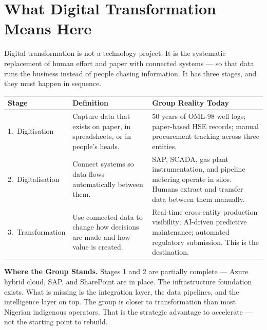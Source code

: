 \documentclass[10pt]{article}
\begin{document}
\vspace{10pt}

\section{What Digital Transformation Means Here}

Digital transformation is not a technology project. It is the systematic replacement
of human effort and paper with connected systems --- so that data runs the business
instead of people chasing information. It has three stages, and they must happen in
sequence.

\vspace{4pt}
\small
\begin{tabularx}{\columnwidth}{@{}lXX@{}}
\toprule
\textbf{Stage} & \textbf{Definition} & \textbf{Group Reality Today} \\
\midrule
1.\ Digitisation
  & Capture data that exists on paper, in spreadsheets, or in people's heads.
  & 50 years of OML-98 well logs; paper-based HSE records; manual procurement
    tracking across three entities. \\[4pt]
2.\ Digitalisation
  & Connect systems so data flows automatically between them.
  & SAP, SCADA, gas plant instrumentation, and pipeline metering operate in silos.
    Humans extract and transfer data between them manually. \\[4pt]
3.\ Transformation
  & Use connected data to change how decisions are made and how value is created.
  & Real-time cross-entity production visibility; AI-driven predictive maintenance;
    automated regulatory submission. This is the destination. \\
\bottomrule
\end{tabularx}
\normalsize

\vspace{4pt}
\noindent\colorbox{primary!8}{%
\begin{minipage}{\dimexpr\textwidth-2\fboxsep}
  \vspace{5pt}
  \textbf{\color{primary}Where the Group Stands.}\quad
  Stages 1 and 2 are partially complete --- Azure hybrid cloud, SAP, and SharePoint
  are in place. The infrastructure foundation exists. What is missing is the
  integration layer, the data pipelines, and the intelligence layer on top.
  The group is closer to transformation than most Nigerian indigenous operators.
  That is the strategic advantage to accelerate --- not the starting point to rebuild.
  \vspace{5pt}
\end{minipage}}
\end{document}
